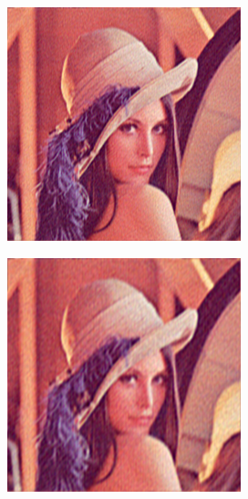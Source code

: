 \pagebreak
{}
\begin{figure}
  \centering
  \begin{subfigure}[b]{0.24\textwidth}
    \centering
    \includegraphics[width=\textwidth]{plaatjes/Lenna_fourier_0_1.png}
  \end{subfigure}
  \begin{subfigure}[b]{0.24\textwidth}
    \centering
    \includegraphics[width=\textwidth]{plaatjes/Lenna_fourier_0_05.png}

\end{subfigure}
\end{figure}
